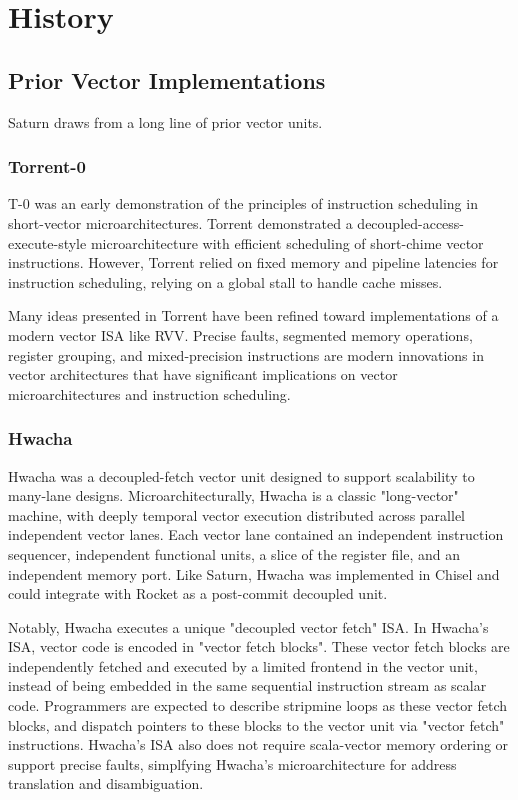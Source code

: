 \newpage
\section{History}
\label{sec:history}

\subsection{Prior Vector Implementations}

Saturn draws from a long line of prior vector units.

\subsubsection{Torrent-0}

T-0 \cite{t0} was an early demonstration of the principles of instruction scheduling in short-vector microarchitectures.
Torrent demonstrated a decoupled-access-execute-style microarchitecture with efficient scheduling of short-chime vector instructions.
However, Torrent relied on fixed memory and pipeline latencies for instruction scheduling, relying on a global stall to handle cache misses.

Many ideas presented in Torrent have been refined toward implementations of a modern vector ISA like RVV.
Precise faults, segmented memory operations, register grouping, and mixed-precision instructions are modern innovations in vector architectures that have significant implications on vector microarchitectures and instruction scheduling.


\subsubsection{Hwacha}

Hwacha \cite{hwacha_manual} was a decoupled-fetch vector unit designed to support scalability to many-lane designs.
Microarchitecturally, Hwacha is a classic "long-vector" machine, with deeply temporal vector execution distributed across parallel independent vector lanes.
Each vector lane contained an independent instruction sequencer, independent functional units, a slice of the register file, and an independent memory port.
Like Saturn, Hwacha was implemented in Chisel and could integrate with Rocket as a post-commit decoupled unit.

Notably, Hwacha executes a unique "decoupled vector fetch" ISA.
In Hwacha's ISA, vector code is encoded in "vector fetch blocks".
These vector fetch blocks are independently fetched and executed by a limited frontend in the vector unit, instead of being embedded in the same sequential instruction stream as scalar code.
Programmers are expected to describe stripmine loops as these vector fetch blocks, and dispatch pointers to these blocks to the vector unit via "vector fetch" instructions.
Hwacha's ISA also does not require scala-vector memory ordering or support precise faults, simplfying Hwacha's microarchitecture for address translation and disambiguation.

